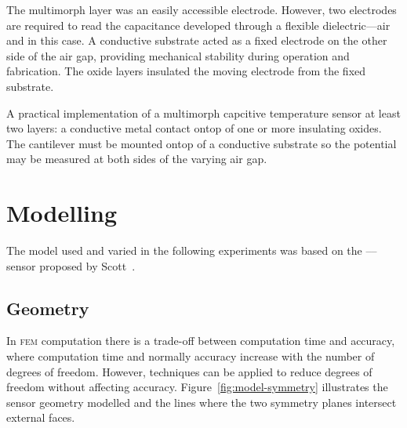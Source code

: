 \documentclass[a4paper,10pt,twocolumn]{article}
\newcommand{\fem}{\textsc{fem}\xspace}
\begin{document}
The  multimorph layer was an easily accessible electrode. However, two
electrodes are required to read the capacitance developed through a flexible
dielectric---air and in this case.  A conductive  substrate acted as a 
fixed electrode on the other side of the air gap, providing mechanical stability 
during operation and fabrication. The oxide layers insulated the moving  
electrode from the fixed  substrate.

A practical implementation of a multimorph capcitive temperature sensor at least
two layers: a conductive metal contact ontop of one or more insulating oxides.
The cantilever must be mounted ontop of a conductive substrate so the potential
may be measured at both sides of the varying air gap.

\section{Modelling}

The model used and varied in the following experiments was based on the 
---- sensor proposed by Scott~\cite{scott2012600}.

\subsection{Geometry}

In \fem computation there is a trade-off between computation time and accuracy,
where computation time and normally accuracy increase with the number of degrees
of freedom. However, techniques can be applied to reduce degrees of freedom
without affecting accuracy. Figure~\ref{fig:model-symmetry} illustrates the
sensor geometry modelled and the lines where the two symmetry planes intersect
external faces.
\end{document}
